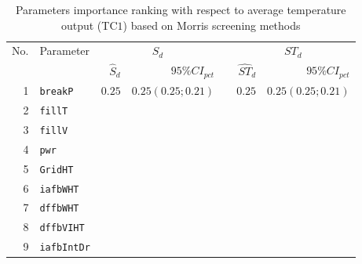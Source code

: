 \begin{table*}[!ht]\centering
{}
\caption{Parameters importance ranking with respect to average temperature output (TC$1$) based on Morris screening methods}
\begin{tabular*}{\textwidth}{@{}rlrrrrr@{}}\toprule
\multirow{2}{*}{\footnotesize{No.}}&\multirow{2}{*}{\footnotesize{Parameter}}&\multicolumn{2}{c}{\footnotesize{$S_d$}}&\phantom{a}&\multicolumn{2}{c}{\footnotesize{$ST_d$}}\\             
                                                                              \cmidrule{3-4}                                       \cmidrule{6-7}
                                   &                                         &\footnotesize{$\hat{S}_d$}&\footnotesize{$95\%CI_{pct}$}&&\footnotesize{$\hat{ST}_d$}&\footnotesize{$95\%CI_{pct}$} \\ \midrule
\footnotesize{1}   & \footnotesize{\texttt{breakP}}     &  \footnotesize{$0.25$} &\footnotesize{$0.25 (0.25;0.21)$}&& \footnotesize{$0.25$}   &   \footnotesize{$0.25 (0.25;0.21)$}   \\
\footnotesize{2}   & \footnotesize{\texttt{fillT}}     	&                        &                                 &&                         &    \\
\footnotesize{3}   & \footnotesize{\texttt{fillV}}     	&                        &                                 &&                         &    \\
\footnotesize{4}   & \footnotesize{\texttt{pwr}}       	&                        &                                 &&                         &    \\
\footnotesize{5}   & \footnotesize{\texttt{GridHT}}     &                        &                                 &&                         &    \\
\footnotesize{6}   & \footnotesize{\texttt{iafbWHT}}    &                        &                                 &&                         &    \\
\footnotesize{7}   & \footnotesize{\texttt{dffbWHT}}    &                        &                                 &&                         &    \\
\footnotesize{8}   & \footnotesize{\texttt{dffbVIHT}}   &                        &                                 &&                         &    \\
\footnotesize{9}   & \footnotesize{\texttt{iafbIntDr}}  &                        &                                 &&                         &    \\

\end{tabular*}
\end{table*}
